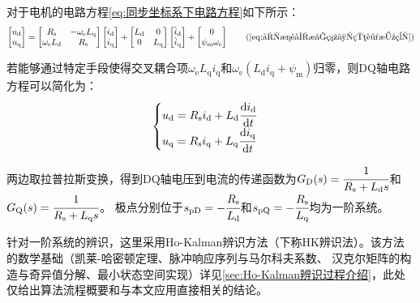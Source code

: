 对于电机的电路方程\eqref{eq:同步坐标系下电路方程}如下所示：
\begin{equation}
    \begin{bmatrix}
        u_{\mathrm{d}}\\u_{\mathrm{q}}
    \end{bmatrix}
    =\begin{bmatrix}R_{\mathrm{s}}&-\omega_{\mathrm{e}}L_{\mathrm{q}}\\\omega_{\mathrm{e}}L_{\mathrm{d}}&R_{\mathrm{s}}\end{bmatrix}
    \begin{bmatrix}i_{\mathrm{d}}\\i_{\mathrm{q}}\end{bmatrix}
    +\begin{bmatrix}L_{\mathrm{d}}&0\\0&L_{\mathrm{q}}\end{bmatrix}
    \begin{bmatrix}\dot{i}_{\mathrm{d}}\\\dot{i}_{\mathrm{q}}\end{bmatrix}
    +\begin{bmatrix}0\\\psi_{\mathrm{m}}\omega_{\mathrm{e}}\end{bmatrix}
    \tag{\ref{eq:同步坐标系下电路方程}}
\end{equation}

若能够通过特定手段使得交叉耦合项\(\omega_{\mathrm{e}} L_{\mathrm{q}}i_{\mathrm{q}}\)和\(\omega_{\mathrm{e}}(L_{\mathrm{d}}i_{\mathrm{q}}+\psi_{\mathrm{m}})\)归零，则DQ轴电路方程可以简化为：
\begin{equation*}
    \begin{cases}
        u_{\mathrm{d}}=R_{\mathrm{s}}i_{\mathrm{d}}+L_{\mathrm{d}}\cfrac{\mathrm{d} i_{\mathrm{d}}}{\mathrm{d} t}\\
        u_{\mathrm{q}}=R_{\mathrm{s}}i_{\mathrm{q}}+L_{\mathrm{q}}\cfrac{\mathrm{d} i_{\mathrm{q}}}{\mathrm{d} t}
    \end{cases}
\end{equation*}

两边取拉普拉斯变换，得到DQ轴电压到电流的传递函数为\(G_{\mathrm{D}}(s)=\cfrac{1}{R_{\mathrm{s}}+L_{\mathrm{d}}s}\)和\(G_{\mathrm{Q}}(s)=\cfrac{1}{R_{\mathrm{s}}+L_{\mathrm{q}}s}\)。
极点分别位于\(s_{\mathrm{pD}}=-\cfrac{R_{\mathrm{s}}}{L_{\mathrm{d}}}\)和\(s_{\mathrm{pQ}}=-\cfrac{R_{\mathrm{s}}}{L_{\mathrm{q}}}\)均为一阶系统。

针对一阶系统的辨识，这里采用Ho-Kalman辨识方法（下称HK辨识法）。该方法的数学基础（凯莱-哈密顿定理、脉冲响应序列与马尔科夫系数、
汉克尔矩阵的构造与奇异值分解、最小状态空间实现）详见\ref{sec:Ho-Kalman辨识过程介绍}，此处仅给出算法流程概要和与本文应用直接相关的结论。

